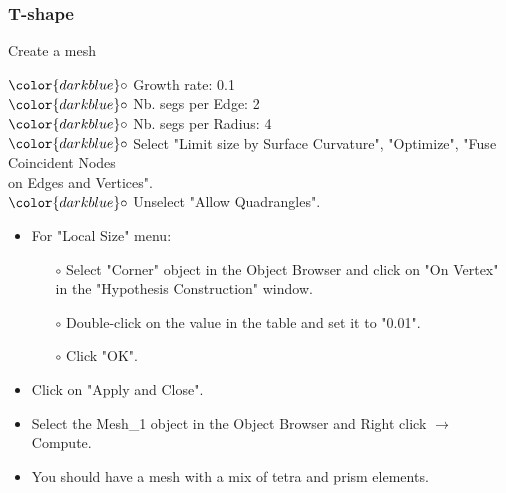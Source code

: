 \documentclass[10pt, hyperref={unicode=true,pdfusetitle, bookmarks=true,bookmarksnumbered=false,bookmarksopen=false, breaklinks=false,pdfborder={0 0 1},backref=true,colorlinks=true,linkcolor=darkblue,pageanchor}]{beamer}
\begin{document}
\begin{frame}
\frametitle{T-shape}
\begin{block}{Create a mesh}

\hspace{1cm} $\color{darkblue}\circ$ {\small{Growth rate: 0.1}}\\
\hspace{1cm} $\color{darkblue}\circ$ {\small{Nb. segs per Edge: 2}}\\
\hspace{1cm} $\color{darkblue}\circ$ {\small{Nb. segs per Radius: 4}}\\
\hspace{1cm} $\color{darkblue}\circ$ {\small{Select "Limit size by Surface Curvature", "Optimize", "Fuse Coincident Nodes \\
\hspace{1,3cm} on Edges and Vertices".}}\\
\hspace{1cm} $\color{darkblue}\circ$ {\small{Unselect "Allow Quadrangles".}}\\

\begin{itemize}
\item For "Local Size" menu:
    \begin{itemize}
    \item [$\circ$] Select "Corner" object in the Object Browser and click on "On Vertex" in the "Hypothesis Construction" window.
    \item [$\circ$] Double-click on the value in the table and set it to "0.01".
    \item [$\circ$] Click "OK".
    \end{itemize}
\item Click on "Apply and Close".
\item Select the Mesh\_1 object in the Object Browser and Right click $\rightarrow$ Compute.
\item You should have a mesh with a mix of tetra and prism elements.

\end{itemize}

\end{block}
\end{frame}
\end{document}
